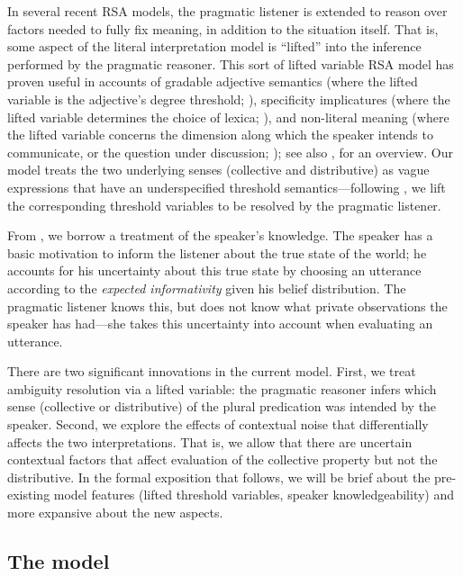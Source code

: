 \documentclass[preprint,12pt,authoryear,titlepage]{elsarticle}
\begin{document}
In several recent RSA models, the pragmatic listener is extended to reason over factors needed to fully fix meaning, in addition to the situation itself. 
That is, some aspect of the literal interpretation model is ``lifted'' into the inference performed by the pragmatic reasoner.
This sort of lifted variable RSA model has proven useful in accounts of gradable adjective semantics (where the lifted variable is the adjective's degree threshold; \citealp{lassitergoodman2013}), specificity implicatures (where the lifted variable determines the choice of lexica; \citealp{bergenetal2012}), and non-literal meaning (where the lifted variable concerns the dimension along which the speaker intends to communicate, or the question under discussion; \citealp{kaoetal2014}); see also \citealp{goodmanlassiter2015}, for an overview. Our model treats the two underlying senses (collective and distributive) as vague expressions that have an underspecified threshold semantics---following \citealp{lassitergoodman2013}, we lift the corresponding threshold variables to be resolved by the pragmatic listener.

From \citealp{goodmanstuhlmuller2013}, we borrow a treatment of the speaker's knowledge. The speaker has a basic motivation to inform the listener about the true state of the world; he accounts for his uncertainty about this true state by choosing an utterance according to the \emph{expected informativity} given his belief distribution. The pragmatic listener knows this, but does not know what private observations the speaker has had---she takes this uncertainty into account when evaluating an utterance.

There are two significant innovations in the current model. First, we treat ambiguity resolution via a lifted variable: the pragmatic reasoner infers which sense (collective or distributive) of the plural predication was intended by the speaker. Second, we explore the effects of contextual noise that differentially affects the two interpretations. That is, we allow that there are uncertain contextual factors that affect evaluation of the collective property but not the distributive. 
In the formal exposition that follows, we will be brief about the pre-existing model features (lifted threshold variables, speaker knowledgeability) and more expansive about the new aspects.

\subsection{The model}
\end{document}
